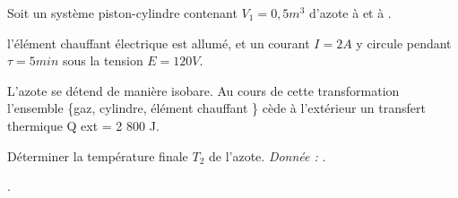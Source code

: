 \begin{Exercise}[title=Chauffage d'un gaz à l'aide une résistance]
Soit un système piston-cylindre contenant $V_1 = 0,5 m^3$ d’azote à  et à .

l'élément chauffant électrique est allumé, et un courant $I = 2A$	y circule pendant $\tau = 5 min$ sous la tension $E = 120 V$.

L’azote se détend de manière isobare. Au cours de cette transformation l’ensemble \{gaz, cylindre, élément chauffant \} cède à l’extérieur un transfert thermique Q ext = 2 800 J.

Déterminer la température finale $T_2$ de l’azote.
\emph{Donnée : }.
\end{Exercise}
\begin{Answer}
		.
\end{Answer}
